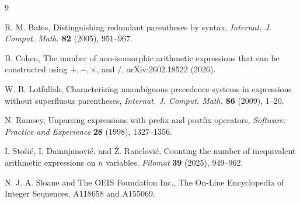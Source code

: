 \documentclass[11pt]{article}
\begin{document}
\begin{thebibliography}{9}
\footnotesize
\setlength{\itemsep}{0pt}

R. M. Bates,
Distinguishing redundant parentheses by syntax,
\emph{Internat. J. Comput. Math.} \textbf{82} (2005), 951--967.

B. Cohen,
The number of non-isomorphic arithmetic expressions that can be constructed
using $+,-,\times$, and $/$,
arXiv:2602.18522 (2026).

W. B. Lotfallah,
Characterizing unambiguous precedence systems in expressions without
superfluous parentheses,
\emph{Internat. J. Comput. Math.} \textbf{86} (2009), 1--20.

N. Ramsey,
Unparsing expressions with prefix and postfix operators,
\emph{Software: Practice and Experience} \textbf{28} (1998), 1327--1356.

I. Sto\v{s}i\'c, I. Damnjanovi\'c, and \v{Z}. Ran{\dj}elovi\'c,
Counting the number of inequivalent arithmetic expressions on $n$ variables,
\emph{Filomat} \textbf{39} (2025), 949--962.

N. J. A. Sloane and The OEIS Foundation Inc.,
The On-Line Encyclopedia of Integer Sequences, A118658 and A155069.

\end{thebibliography}
\end{document}
